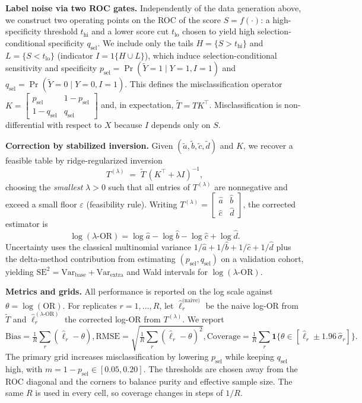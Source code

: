 \documentclass[pdflatex,sn-mathphys-num]{sn-jnl}%
\theoremstyle{thmstyleone}%
\theoremstyle{thmstyletwo}%
\theoremstyle{thmstylethree}%
\begin{document}
\textbf{Label noise via two ROC gates.}
Independently of the data generation above, we construct two operating points on the ROC of the score $S=f(\cdot)$: a high-specificity threshold $t_{\mathrm{hi}}$ and a lower score cut $t_{\mathrm{lo}}$ chosen to yield high selection-conditional specificity $q_{\mathrm{sel}}$. We include only the tails $H=\{S>t_{\mathrm{hi}}\}$ and $L=\{S<t_{\mathrm{lo}}\}$ (indicator $I=1\{H\cup L\}$), which induce selection-conditional sensitivity and specificity
$p_{\mathrm{sel}}=\Pr(\tilde Y=1\mid Y=1,I=1)$ and $q_{\mathrm{sel}}=\Pr(\tilde Y=0\mid Y=0,I=1)$.
This defines the misclassification operator
$K=\begin{bmatrix} p_{\mathrm{sel}} & 1-p_{\mathrm{sel}}\\[2pt] 1-q_{\mathrm{sel}} & q_{\mathrm{sel}}\end{bmatrix}$ and, in expectation, $\tilde T = T K^{\!\top}$.
Misclassification is non-differential with respect to $X$ because $I$ depends only on $S$.

\textbf{Correction by stabilized inversion.}
Given $(\tilde a,\tilde b,\tilde c,\tilde d)$ and $K$, we recover a feasible table by ridge-regularized inversion
\[
T^{(\lambda)} \;=\; \tilde T\,(K^{\!\top}+\lambda I)^{-1},
\]
choosing the \emph{smallest} $\lambda>0$ such that all entries of $T^{(\lambda)}$ are nonnegative and exceed a small floor $\varepsilon$ (feasibility rule). Writing $T^{(\lambda)}=\begin{bmatrix}\hat a&\hat b\\ \hat c&\hat d\end{bmatrix}$, the corrected estimator is
\[
\log(\lambda\text{-OR})=\log\hat a-\log\hat b-\log\hat c+\log\hat d.
\]
Uncertainty uses the classical multinomial variance $1/\hat a+1/\hat b+1/\hat c+1/\hat d$ plus the delta-method contribution from estimating $(p_{\mathrm{sel}},q_{\mathrm{sel}})$ on a validation cohort, yielding $\mathrm{SE}^2=\mathrm{Var}_{\text{base}}+\mathrm{Var}_{\text{extra}}$ and Wald intervals for $\log(\lambda\text{-OR})$.

\textbf{Metrics and grids.}
All performance is reported on the log scale against $\theta=\log(\mathrm{OR})$. For replicates $r=1,\ldots,R$, let $\widehat\ell_{r}^{\text{(naive)}}$ be the naive log-OR from $\tilde T$ and $\widehat\ell_{r}^{(\lambda\text{-OR})}$ the corrected log-OR from $T^{(\lambda)}$. We report
\[
\mathrm{Bias}=\tfrac1R\sum_{r}(\widehat\ell_r-\theta),
\mathrm{RMSE}=\sqrt{\tfrac1R\sum_{r}(\widehat\ell_r-\theta)^2},
\mathrm{Coverage}=\tfrac1R\sum_{r}\mathbf{1}\{\theta\in[\widehat\ell_r\pm1.96\,\widehat\sigma_r]\}.
\]
The primary grid increases misclassification by lowering $p_{\mathrm{sel}}$ while keeping $q_{\mathrm{sel}}$ high, with $m=1-p_{\mathrm{sel}}\in [0.05,0.20]$. The thresholds are chosen away from the ROC diagonal and the corners to balance purity and effective sample size. The same $R$ is used in every cell, so coverage changes in steps of $1/R$.
\end{document}
